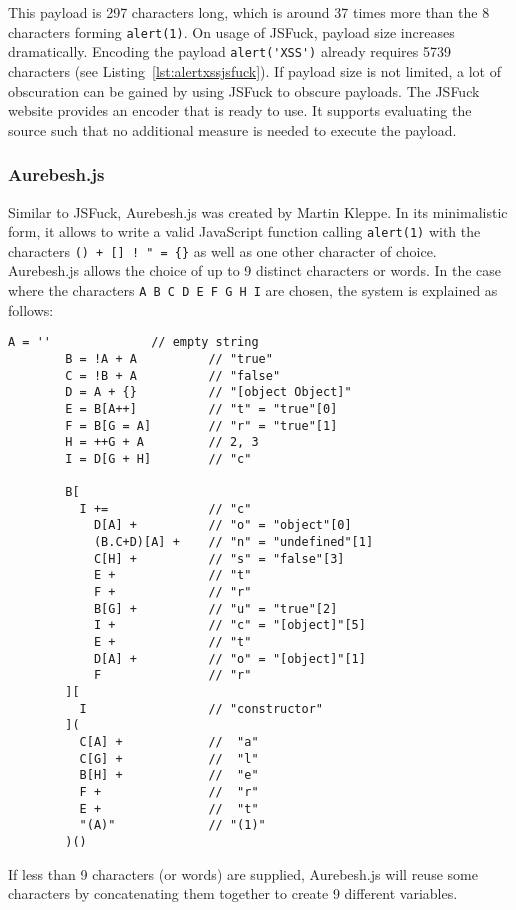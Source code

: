 This payload is 297 characters long, which is around 37 times more than the 8 characters forming \verb|alert(1)|. On usage of JSFuck, payload size increases dramatically. Encoding the payload \verb|alert('XSS')| already requires 5739 characters (see Listing~\ref{lst:alertxssjsfuck}). If payload size is not limited, a lot of obscuration can be gained by using JSFuck to obscure payloads. The JSFuck website provides an encoder that is ready to use. It supports evaluating the source such that no additional measure is needed to execute the payload. \cite{mk/jsfuck}


\subsubsection{Aurebesh.js}
Similar to JSFuck, Aurebesh.js was created by Martin Kleppe. In its minimalistic form, it allows to write a valid JavaScript function calling \verb|alert(1)| with the characters \verb|() + [] ! " = {}| as well as one other character of choice. Aurebesh.js allows the choice of up to 9 distinct characters or words. In the case where the characters \verb|A B C D E F G H I| are chosen, the system is explained as follows:
\begin{lstlisting}[style=basicStyle, caption=Aurebesh.js explanation \cite{mk/aurebesh}, label={lst:aurebeshexplanation}]
		A = ''              // empty string
		B = !A + A          // "true"
		C = !B + A          // "false"
		D = A + {}          // "[object Object]"
		E = B[A++]          // "t" = "true"[0]
		F = B[G = A]        // "r" = "true"[1]
		H = ++G + A         // 2, 3
		I = D[G + H]        // "c"

		B[
		  I +=              // "c"
		    D[A] +          // "o" = "object"[0]
		    (B.C+D)[A] +    // "n" = "undefined"[1]
		    C[H] +          // "s" = "false"[3]
		    E +             // "t"
		    F +             // "r"
		    B[G] +          // "u" = "true"[2]
		    I +             // "c" = "[object]"[5]
		    E +             // "t"
		    D[A] +          // "o" = "[object]"[1]
		    F               // "r"
		][
		  I                 // "constructor"
		](
		  C[A] +            //  "a"
		  C[G] +            //  "l"
		  B[H] +            //  "e"
		  F +               //  "r"
		  E +               //  "t"
		  "(A)"             // "(1)"
		)()
\end{lstlisting}
If less than 9 characters (or words) are supplied, Aurebesh.js will reuse some characters by concatenating them together to create 9 different variables. \cite{mk/aurebesh}

